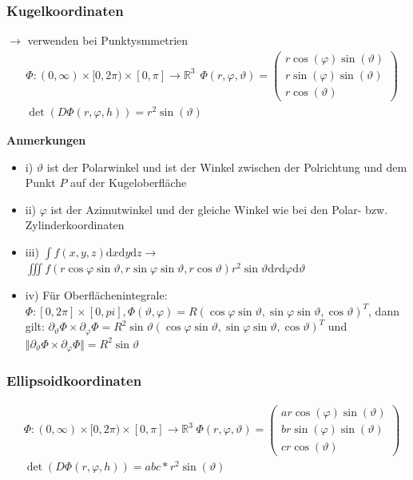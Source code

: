 \documentclass[8pt, a4paper, landscape, fleqn]{scrartcl}
\newenvironment {annotation}[1]
				{\begin{itshape} \begin{small} \textbf{#1} \begin{itemize}}
				{\end{itemize} \end{small} \end{itshape}}
\def\d{\text{d}}
\begin{document}
\begin{multicols*}{3}
				\subsubsection{Kugelkoordinaten}
				    $\rightarrow$ verwenden bei Punktysmmetrien
					\vspace{-7pt}
					\begin{align*}
						&\Phi: (0, \infty)\times [0, 2\pi)\times [0, \pi] \rightarrow \mathbb{R}^3 \hspace{5pt} \Phi(r, \varphi, \vartheta)=
						\begin{pmatrix}
							r\cos(\varphi)\sin(\vartheta)\\
							r\sin(\varphi)\sin(\vartheta)\\ 
							r\cos(\vartheta)
						\end{pmatrix}\\
						&\det (D\Phi (r, \varphi, h))=r^2\sin(\vartheta)
					\end{align*}
					\begin{annotation}{Anmerkungen}
						\item[i)] $\vartheta$ ist der Polarwinkel und ist der Winkel zwischen der Polrichtung und dem Punkt $P$ auf der Kugeloberfläche
						\item[ii)] $\varphi$ ist der Azimutwinkel und der gleiche Winkel wie bei den Polar- bzw. Zylinderkoordinaten
						\item[iii)] $\int f(x, y, z) \d x \d y \d z \rightarrow$ \newline$\iiint f(r\cos\varphi\sin\vartheta, r\sin\varphi\sin\vartheta, r\cos\vartheta)r^2\sin\vartheta \d r \d\varphi \d\vartheta$
						\item[iv)] Für Oberflächenintegrale: $\Phi : [0, 2\pi]\times[0, pi], \Phi(\vartheta, \varphi) = R(\cos\varphi\sin\vartheta, \sin\varphi\sin\vartheta, \cos\vartheta)^T$, dann gilt: $\partial_\vartheta \Phi \times \partial_\varphi \Phi = R^2\sin\vartheta(\cos\varphi\sin\vartheta, \sin\varphi\sin\vartheta, \cos\vartheta)^T$ und $\Vert \partial_\vartheta \Phi \times \partial_\varphi \Phi\Vert = R^2\sin\vartheta$
					\end{annotation}
					\subsubsection{Ellipsoidkoordinaten}
					\vspace{-7pt}
					\begin{align*}
						&\Phi: (0, \infty)\times [0, 2\pi)\times [0, \pi] \rightarrow \mathbb{R}^3 \hspace{3pt} \Phi(r, \varphi, \vartheta)=
						\begin{pmatrix}
							ar\cos(\varphi)\sin(\vartheta)\\
							br\sin(\varphi)\sin(\vartheta)\\ 
							cr\cos(\vartheta)
						\end{pmatrix}\\
						&\det (D\Phi (r, \varphi, h))=abc * r^2\sin(\vartheta)
					\end{align*}

\end{multicols*}
\end{document}
